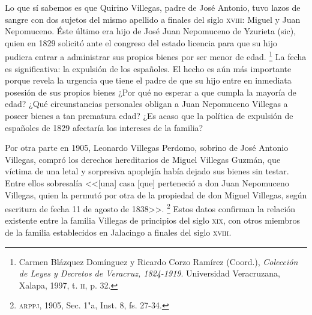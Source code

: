 \documentclass[14pt,twoside,final]{extbook} %
\let\oldfootnote\footnote
\renewcommand\footnote[1]{%
\oldfootnote{\hspace{1mm}#1}}
\begin{document}
Lo que sí sabemos es que Quirino Villegas, padre de José Antonio, tuvo lazos de sangre con dos sujetos del mismo apellido a finales del siglo \textsc{xviii}: Miguel y Juan Nepomuceno. Éste último era hijo de José Juan Nepomuceno de Yzurieta (sic), quien en 1829 solicitó ante el congreso del estado licencia para que su hijo pudiera entrar a administrar sus propios bienes por ser menor de edad.\footnote{Carmen Blázquez Domínguez y Ricardo Corzo Ramírez (Coord.), \emph{Colección de Leyes y Decretos de Veracruz, 1824-1919}. Universidad Veracruzana, Xalapa, 1997, t. \textsc{ii}, p. 32.} La fecha es significativa: la expulsión de los españoles. El hecho es aún más importante porque revela la urgencia que tiene el padre de que su hijo entre en inmediata posesión de sus propios bienes ¿Por qué no esperar a que cumpla la mayoría de edad? ¿Qué circunstancias personales obligan a Juan Nepomuceno Villegas a poseer bienes a tan prematura edad? ¿Es acaso que la política de expulsión de españoles de 1829 afectaría los intereses de la familia?

Por otra parte en 1905, Leonardo Villegas Perdomo, sobrino de José Antonio Villegas, compró los derechos hereditarios de Miguel Villegas Guzmán, que víctima de una letal y sorpresiva apoplejía había dejado sus bienes sin testar. Entre ellos sobresalía <<[una] casa [que] perteneció a don Juan Nepomuceno Villegas, quien la permutó por otra de la propiedad de don Miguel Villegas, según escritura de fecha 11 de agosto de 1838>>.\footnote{\textsc{arppj}, 1905, Sec. 1"a, Inst. 8, fs. 27-34.} Estos datos confirman la relación existente entre la familia Villegas de principios del siglo \textsc{xix}, con otros miembros de la familia establecidos en Jalacingo a finales del siglo \textsc{xviii}.
\end{document}
